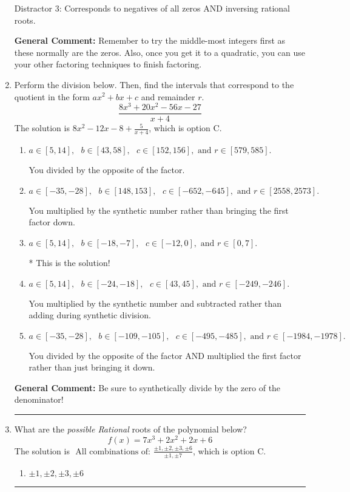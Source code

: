 \documentclass{extbook}[14pt]
\newcommand{\litem}[1]{\item #1

\rule{\textwidth}{0.4pt}}
\begin{document}
\begin{enumerate}
{\begin{enumerate}[label=\Alph*.]
 Distractor 3: Corresponds to negatives of all zeros AND inversing rational roots.
\end{enumerate}

\textbf{General Comment:} Remember to try the middle-most integers first as these normally are the zeros. Also, once you get it to a quadratic, you can use your other factoring techniques to finish factoring.
}
\litem{
Perform the division below. Then, find the intervals that correspond to the quotient in the form $ax^2+bx+c$ and remainder $r$.
\[ \frac{8x^{3} +20 x^{2} -56 x -27}{x + 4} \]The solution is \( 8x^{2} -12 x -8 + \frac{5}{x + 4} \), which is option C.\begin{enumerate}[label=\Alph*.]
\item \( a \in [5, 14], \text{   } b \in [43, 58], \text{   } c \in [152, 156], \text{   and   } r \in [579, 585]. \)

 You divided by the opposite of the factor.
\item \( a \in [-35, -28], \text{   } b \in [148, 153], \text{   } c \in [-652, -645], \text{   and   } r \in [2558, 2573]. \)

 You multiplied by the synthetic number rather than bringing the first factor down.
\item \( a \in [5, 14], \text{   } b \in [-18, -7], \text{   } c \in [-12, 0], \text{   and   } r \in [0, 7]. \)

* This is the solution!
\item \( a \in [5, 14], \text{   } b \in [-24, -18], \text{   } c \in [43, 45], \text{   and   } r \in [-249, -246]. \)

 You multiplied by the synthetic number and subtracted rather than adding during synthetic division.
\item \( a \in [-35, -28], \text{   } b \in [-109, -105], \text{   } c \in [-495, -485], \text{   and   } r \in [-1984, -1978]. \)

 You divided by the opposite of the factor AND multiplied the first factor rather than just bringing it down.
\end{enumerate}

\textbf{General Comment:} Be sure to synthetically divide by the zero of the denominator!
}
\litem{
What are the \textit{possible Rational} roots of the polynomial below?
\[ f(x) = 7x^{3} +2 x^{2} +2 x + 6 \]The solution is \( \text{ All combinations of: }\frac{\pm 1,\pm 2,\pm 3,\pm 6}{\pm 1,\pm 7} \), which is option C.\begin{enumerate}[label=\Alph*.]
\item \( \pm 1,\pm 2,\pm 3,\pm 6 \)


\end{enumerate}}
\end{enumerate}
\end{document}
